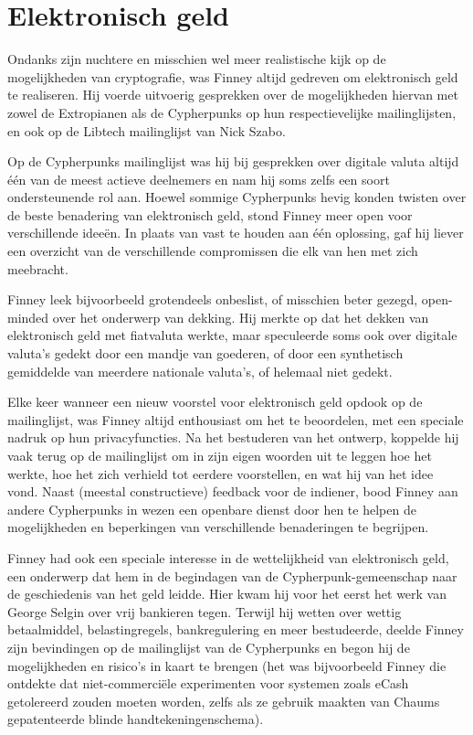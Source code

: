 \documentclass[
  a5paper,
  smalldemyvopaper,11pt,twoside,onecolumn,openright,extrafontsizes,
hidelinks]{memoir}
\begin{document}
\section{Elektronisch geld}\label{elektronisch-geld}

Ondanks zijn nuchtere en misschien wel meer realistische kijk op de
mogelijkheden van cryptografie, was Finney altijd gedreven om
elektronisch geld te realiseren. Hij voerde uitvoerig gesprekken over de
mogelijkheden hiervan met zowel de Extropianen als de Cypherpunks op hun
respectievelijke mailinglijsten, en ook op de Libtech mailinglijst van
Nick Szabo.

Op de Cypherpunks mailinglijst was hij bij gesprekken over digitale
valuta altijd één van de meest actieve deelnemers en nam hij soms zelfs
een soort ondersteunende rol aan. Hoewel sommige Cypherpunks hevig
konden twisten over de beste benadering van elektronisch geld, stond
Finney meer open voor verschillende ideeën. In plaats van vast te houden
aan één oplossing, gaf hij liever een overzicht van de verschillende
compromissen die elk van hen met zich meebracht.

Finney leek bijvoorbeeld grotendeels onbeslist, of misschien beter
gezegd, open-minded over het onderwerp van dekking. Hij merkte op dat
het dekken van elektronisch geld met fiatvaluta werkte, maar speculeerde
soms ook over digitale valuta's gedekt door een mandje van goederen, of
door een synthetisch gemiddelde van meerdere nationale valuta's, of
helemaal niet gedekt.

Elke keer wanneer een nieuw voorstel voor elektronisch geld opdook op de
mailinglijst, was Finney altijd enthousiast om het te beoordelen, met
een speciale nadruk op hun privacyfuncties. Na het bestuderen van het
ontwerp, koppelde hij vaak terug op de mailinglijst om in zijn eigen
woorden uit te leggen hoe het werkte, hoe het zich verhield tot eerdere
voorstellen, en wat hij van het idee vond. Naast (meestal constructieve)
feedback voor de indiener, bood Finney aan andere Cypherpunks in wezen
een openbare dienst door hen te helpen de mogelijkheden en beperkingen
van verschillende benaderingen te begrijpen.

Finney had ook een speciale interesse in de wettelijkheid van
elektronisch geld, een onderwerp dat hem in de begindagen van de
Cypherpunk-gemeenschap naar de geschiedenis van het geld leidde. Hier
kwam hij voor het eerst het werk van George Selgin over vrij bankieren
tegen. Terwijl hij wetten over wettig betaalmiddel, belastingregels,
bankregulering en meer bestudeerde, deelde Finney zijn bevindingen op de
mailinglijst van de Cypherpunks en begon hij de mogelijkheden en
risico's in kaart te brengen (het was bijvoorbeeld Finney die ontdekte
dat niet-commerciële experimenten voor systemen zoals eCash getolereerd
zouden moeten worden, zelfs als ze gebruik maakten van Chaums
gepatenteerde blinde handtekeningenschema).
\end{document}

